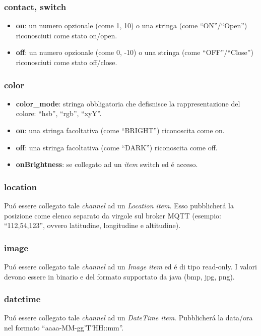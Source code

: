 \subsubsection{contact, switch}
\begin{itemize}
    \item \textbf{on}: un numero opzionale (come 1, 10) o una stringa (come ``ON''/``Open'') riconosciuti come stato on/open.
    \item \textbf{off}: un numero opzionale (come 0, -10) o una stringa (come ``OFF''/``Close'') riconosciuti come stato off/close.
\end{itemize}

\subsubsection{color}
\begin{itemize}
    \item \textbf{color\_mode}: stringa obbligatoria che defisnisce la rappresentazione del colore: ``hsb'', ``rgb'', ``xyY''.
    \item \textbf{on}: una stringa facoltativa (come ``BRIGHT'') riconoscita come on.
    \item \textbf{off}: una stringa facoltativa (come ``DARK'') riconoscita come off.
    \item \textbf{onBrightness}: se collegato ad un {\em item} switch ed \'e acceso.
\end{itemize}

\subsubsection{location}
Pu\'o essere collegato tale {\em channel} ad un {\em Location item}. Esso pubblicher\'a la posizione come elenco separato da virgole sul broker MQTT (esempio: ``112,54,123'', ovvero latitudine, longitudine e altitudine).

\subsubsection{image}
Pu\'o essere collegato tale {\em channel} ad un {\em Image item} ed \'e di tipo read-only. I valori devono essere in binario e del formato supportato da java (bmp, jpg, png).

\subsubsection{datetime}
Pu\'o essere collegato tale {\em channel} ad un {\em DateTime item}. Pubblicher\'a la data/ora nel formato ``aaaa-MM-gg'T'HH::mm''.

